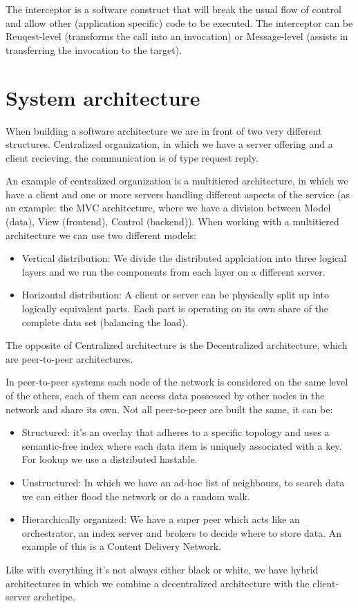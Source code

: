 The interceptor is a software construct that will break the usual flow of control and allow other (application specific) code to be executed. The interceptor can be Reuqest-level (transforms the call into an invocation) or Message-level (assists in transferring the invocation to the target).

\section{System architecture}
When building a software architecture we are in front of two very different structures. Centralized organization, in which we have a server offering and a client recieving, the communication is of type request reply.

An example of centralized organization is a multitiered architecture, in which we have a client and one or more servers handling different aspects of the service (as an example: the MVC architecture, where we have a division between Model (data), View (frontend), Control (backend)). When working with a multitiered architecture we can use two different models:
\begin{itemize}
    \item Vertical distribution: We divide the distributed applciation into three logical layers and we run the components from each layer on a different server.
    \item Horizontal distribution: A client or server can be physically split up into logically equivalent parts. Each part is operating on its own share of the complete data set (balancing the load).
\end{itemize}
The opposite of Centralized architecture is the Decentralized architecture, which are peer-to-peer architectures.

In peer-to-peer systems each node of the network is considered on the same level of the others, each of them can access data possessed by other nodes in the network and share its own. Not all peer-to-peer are built the same, it can be:
\begin{itemize}
    \item Structured: it's an overlay that adheres to a specific topology and uses a semantic-free index where each data item is uniquely associated with a key. For lookup we use a distributed hastable.
    \item Unstructured: In which we have an ad-hoc list of neighbours, to search data we can either flood the network or do a random walk.
    \item Hierarchically organized: We have a super peer which acts like an orchestrator, an index server and brokers to decide where to store data. An example of this is a Content Delivery Network.
\end{itemize}
Like with everything it's not always either black or white, we have hybrid architectures in which we combine a decentralized architecture with the client-server archetipe.

